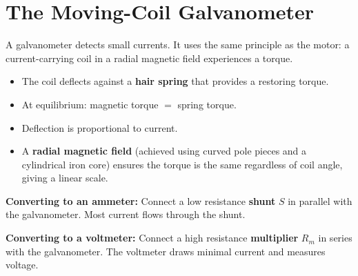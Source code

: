 \begin{diagbox}
\begin{center}
\end{center}
\end{diagbox}

\section{The Moving-Coil Galvanometer}

\begin{processbox}
A galvanometer detects small currents. It uses the
same principle as the motor: a current-carrying coil
in a radial magnetic field experiences a torque.

\begin{itemize}[noitemsep]
  \item The coil deflects against a \textbf{hair
  spring} that provides a restoring torque.
  \item At equilibrium: magnetic torque $=$ spring torque.
  \item Deflection is proportional to current.
  \item A \textbf{radial magnetic field} (achieved
  using curved pole pieces and a cylindrical iron
  core) ensures the torque is the same regardless
  of coil angle, giving a linear scale.
\end{itemize}

\textbf{Converting to an ammeter:} Connect a low
resistance \textbf{shunt} $S$ in parallel with the
galvanometer. Most current flows through the shunt.

\textbf{Converting to a voltmeter:} Connect a high
resistance \textbf{multiplier} $R_m$ in series with
the galvanometer. The voltmeter draws minimal current
and measures voltage.
\end{processbox}

